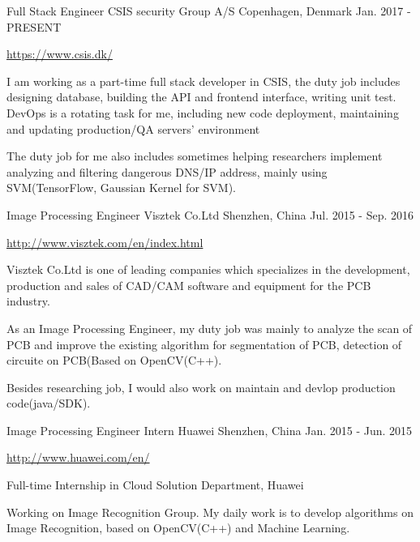 \begin{cventries}
  \cventry
    {Full Stack Engineer}
    {CSIS security Group A/S}
    {Copenhagen, Denmark}
    {Jan. 2017 - PRESENT}
    {
      \begin{cvitems}
        \item {\url{https://www.csis.dk/}}
        \item {I am working as a part-time full stack developer in CSIS, the duty job includes designing database, building the API and frontend interface, writing unit test. DevOps is a rotating task for me, including new code deployment, maintaining and updating production/QA servers' environment}
	\item {The duty job for me also includes sometimes helping researchers implement analyzing and filtering dangerous  DNS/IP address, mainly using SVM(TensorFlow, Gaussian Kernel for SVM).}
      \end{cvitems}
    }
  \cventry
    {Image Processing Engineer}
    {Visztek Co.Ltd}
    {Shenzhen, China}
    {Jul. 2015 - Sep. 2016}
    {
      \begin{cvitems}
        \item {\url{http://www.visztek.com/en/index.html}}
        \item {Visztek Co.Ltd is one of leading companies which specializes in the development, production and sales of CAD/CAM software and equipment for the PCB industry.}
	\item {As an Image Processing Engineer, my duty job was mainly to analyze the scan of PCB and improve the existing algorithm for segmentation of PCB, detection of circuite on PCB(Based on OpenCV(C++).}
	\item {Besides researching job, I would also work on maintain and devlop production code(java/SDK).}
      \end{cvitems}
    }
  \cventry
    {Image Processing Engineer Intern}
    {Huawei}
    {Shenzhen, China}
    {Jan. 2015 - Jun. 2015}
    {
	\begin{cvitems}
	  \item {\url{http://www.huawei.com/en/}}
	  \item {Full-time Internship in Cloud Solution Department, Huawei}
	  \item {Working on Image Recognition Group. My daily work is to develop algorithms on Image Recognition, based on OpenCV(C++) and Machine Learning.}
	\end{cvitems}
    }
\end{cventries}
